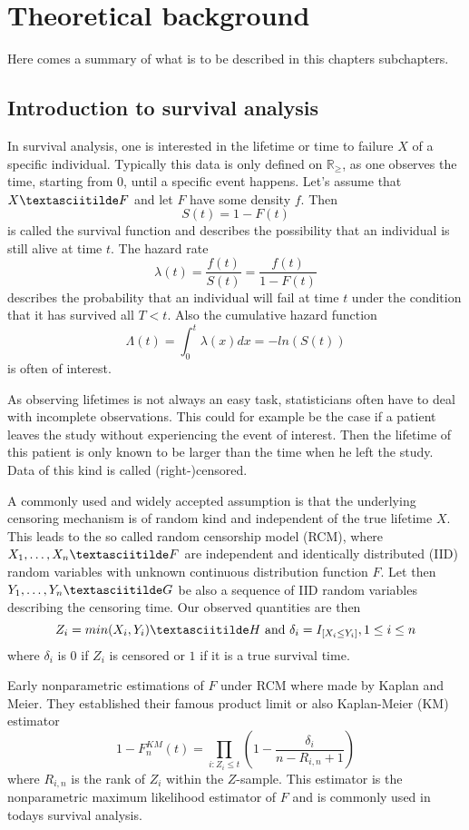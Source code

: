 \chapter{Theoretical background}

Here comes a summary of what is to be described in this chapters subchapters.

\section{Introduction to survival analysis}

In survival analysis, one is interested in the lifetime or time to failure $X$ of a specific individual. Typically this data is only defined on $\mathbb{R}_{\geq}$, as one observes the time, starting from 0, until a specific event happens. Let's assume that $X \textasciitilde F$ and let $F$ have some density $f$. Then
\[
S(t) = 1 - F(t)
\]
is called the survival function and describes the possibility that an individual is still alive at time $t$. The hazard rate 
\[
\lambda(t) = \frac{f(t)}{S(t)} = \frac{f(t)}{1-F(t)}
\]
describes the probability that an individual will fail at time $t$ under the condition that it has survived all $T<t$.
Also the cumulative hazard function 
\[
\Lambda(t) = \int_{0}^{t}\lambda(x)dx = -ln(S(t))
\]
is often of interest.

As observing lifetimes is not always an easy task, statisticians often have to deal with incomplete observations. This could for example be the case if a patient leaves the study without experiencing the event of interest. Then the lifetime of this patient is only known to be larger than the time when he left the study. Data of this kind is called (right-)censored.

A commonly used and widely accepted assumption is that the underlying censoring mechanism is of random kind and independent of the true lifetime $X$.
This leads to the so called random censorship model (RCM), where $X_1,\ldots ,X_n \textasciitilde F$ are independent and identically distributed (IID) random variables with unknown continuous distribution function $F$. Let then $Y_1,\ldots ,Y_n \textasciitilde G$ be also a sequence of IID random variables describing the censoring time. Our observed quantities are then
\[
Z_i = min(X_i,Y_i) \textasciitilde H \text{ and } \delta_i = I_{[X_i\leq Y_i]}, 1 \leq i \leq n
\]
where $\delta_i$ is $0$ if $Z_i$ is censored or $1$ if it is a true survival time.

Early nonparametric estimations of $F$ under RCM where made by Kaplan and Meier\cite{KAPLANMEIER}. They established their famous product limit or also Kaplan-Meier (KM) estimator 
\begin{equation}\label{fnkm}
1-F_n^{KM}(t) =  \prod_{i:Z_i \leq t} \left( 1 - \frac{\delta_i}{n-R_{i,n} + 1} \right)
\end{equation}
where $R_{i,n}$ is the rank of $Z_i$ within the $Z$-sample. This estimator is the nonparametric maximum likelihood estimator of $F$ and is commonly used in todays survival analysis.


